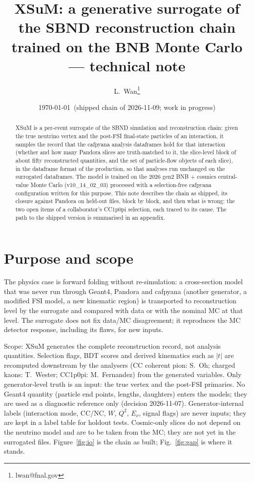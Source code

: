 \documentclass[11pt]{article}
\title{XSuM: a generative surrogate of the SBND reconstruction chain\\ trained on the BNB Monte Carlo --- technical note}
\author{L.~Wan\thanks{lwan@fnal.gov}}
\date{\today\ (shipped chain of 2026-11-09; work in progress)}
\newcommand{\real}{Pandora}
\begin{document}
\maketitle

\begin{abstract}
XSuM is a per-event surrogate of the SBND simulation and reconstruction chain: given the true neutrino vertex and
the post-FSI final-state particles of an interaction, it samples the record that the cafpyana analysis dataframes
hold for that interaction (whether and how many Pandora slices are truth-matched to it, the slice-level block of
about fifty reconstructed quantities, and the set of particle-flow objects of each slice), in the dataframe format
of the production, so that analyses run unchanged on the surrogated dataframes. The model is trained on the 2026
gen2 BNB + cosmics central-value Monte Carlo (v10\_14\_02\_03) processed with a selection-free cafpyana
configuration written for this purpose. This note describes the chain as shipped, its closure against \real{} on
held-out files, block by block, and then what is wrong: the two open items of a collaborator's CC1p0pi selection,
each traced to its cause. The path to the shipped version is summarised in an appendix.
\end{abstract}

\tableofcontents
\clearpage

\section{Purpose and scope}
\label{sec:scope}

The physics case is forward folding without re-simulation: a cross-section model that was never run through
Geant4, Pandora and cafpyana (another generator, a modified FSI model, a new kinematic region) is transported to
reconstruction level by the surrogate and compared with data or with the nominal MC at that level. The surrogate
does not fix data/MC disagreement; it reproduces the MC detector response, including its flaws, for new inputs.

Scope: XSuM generates the complete reconstruction record, not analysis quantities. Selection flags, BDT scores and
derived kinematics such as $|t|$ are recomputed downstream by the analysers (CC coherent pion: S.~Oh; charged
kaons: T.~Wester; CC1p0pi: M.~Fernandez) from the generated variables. Only generator-level truth is an input: the
true vertex and the post-FSI primaries. No Geant4 quantity (particle end points, lengths, daughters) enters the
models; they are used as a diagnostic reference only (decision 2026-11-07). Generator-internal labels (interaction
mode, CC/NC, $W$, $Q^2$, $E_\nu$, signal flags) are never inputs; they are kept in a label table for holdout
tests. Cosmic-only slices do not depend on the neutrino model and are to be taken from the MC; they are not yet in
the surrogated files. Figure~\ref{fig:io} is the chain as built; Fig.~\ref{fig:gap} is where it stands.
\end{document}
